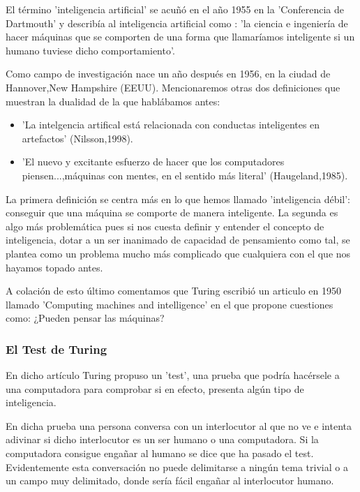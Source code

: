 \vspace{10px}


El término 'inteligencia artificial' se acuñó en el año 1955 en la 'Conferencia de Dartmouth' y describía al inteligencia artificial como : 'la ciencia e ingeniería de hacer máquinas que se comporten de una forma que llamaríamos inteligente si un humano tuviese dicho comportamiento'.

\vspace{10px} 

Como campo de investigación nace un año después en 1956, en la ciudad de Hannover,New Hampshire (EEUU). Mencionaremos otras dos definiciones que muestran la dualidad de la que hablábamos antes:

\begin{itemize}
	\item 'La intelgencia artifical está relacionada con conductas inteligentes en artefactos' (Nilsson,1998).
	\item 'El nuevo y excitante esfuerzo de hacer que los computadores piensen...,máquinas con mentes, en el sentido más literal' (Haugeland,1985).
\end{itemize}

La primera definición se centra más en lo que hemos llamado 'inteligencia débil': conseguir que una máquina se comporte de manera inteligente. La segunda es algo más problemática pues si nos cuesta definir y entender el concepto de inteligencia, dotar a un ser inanimado de capacidad de pensamiento como tal, se plantea como un problema mucho más complicado que cualquiera con el que nos hayamos topado antes.

\vspace{10px}

A colación de esto último comentamos que Turing escribió un articulo en 1950 llamado 'Computing machines and intelligence' en el que propone cuestiones como: ¿Pueden pensar las máquinas?


\subsubsection{El Test de Turing}

En dicho artículo Turing propuso un 'test', una prueba que podría hacérsele a una computadora para comprobar si en efecto, presenta algún tipo de inteligencia.

\vspace{10px}

En dicha prueba una persona conversa con un interlocutor al que no ve e intenta adivinar si dicho interlocutor es un ser humano o una computadora. Si la computadora consigue engañar al humano se dice que ha pasado el test. Evidentemente esta conversación no puede delimitarse a ningún tema trivial o a un campo muy delimitado, donde sería fácil engañar al interlocutor humano.


